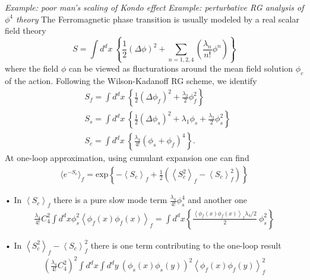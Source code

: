 \documentclass[submission, PhysLectNotes]{SciPost}
\newcommand{\ExOp}[1]{\left\langle#1\right\rangle}
\begin{document}
{\it Example: poor man's scaling of Kondo effect}
{\it Example: perturbative RG analysis of $\phi^4$ theory}
The Ferromagnetic phase transition is usually modeled by a real scalar field theory
\begin{equation}
S = \int d^dx \ \left\{\frac{1}{2}\left(\Delta\phi\right)^2 + \sum_{n=1,2,4}\left(\frac{\lambda_n}{n!}\phi^n\right) \right\}
\end{equation}
where the field $\phi$ can be viewed as flucturations around the mean field solution $\phi_c$ of the action. Following the Wilson-Kadanoff RG scheme, we identify
\begin{equation}
\begin{aligned}
&S_f = \int d^dx \ \left\{\frac{1}{2}\left(\Delta\phi_f\right)^2 + \frac{\lambda_2}{2}\phi_f^2 \right\} \\
&S_s = \int d^dx \ \left\{\frac{1}{2}\left(\Delta\phi_s\right)^2 + \lambda_1 \phi_s + \frac{\lambda_2}{2}\phi_s^2 \right\} \\
&S_c = \int d^dx \ \left\{ \frac{\lambda_4}{4!}\left(\phi_s + \phi_f\right)^4 \right\}.
\end{aligned}
\end{equation}
At one-loop approximation, using cumulant expansion one can find
\begin{equation}
\begin{aligned}
\langle e^{-S_c} \rangle_f = \mathrm{exp}\left\{{-\ExOp{S_c}_f + \frac{1}{2}\left( \ExOp{S_c^2}_f - \ExOp{S_c}_f^2\right)}\right\}
\end{aligned}
\end{equation}%

• In $\ExOp{S_c}_f$ there is a pure slow mode term $\frac{\lambda_4}{4!}\phi_s^4$ and another one
\begin{equation}
\begin{aligned}
\frac{\lambda_4}{4!} C^2_4 \int d^dx  \phi_s^2 \ExOp{\phi_f(x)\phi_f(x)}_f = \int d^dx \left\{ \frac{\ExOp{\phi_f(x)\phi_f(x)}_f\lambda_4/2}{2}\ \phi_s^2\right\}
\end{aligned}
\end{equation}

• In $\ExOp{S_c^2}_f - \ExOp{S_c}_f^2$ there is one term contributing to the one-loop result
\begin{equation}
\begin{aligned}
\left( \frac{\lambda_4}{4!} C^2_4 \right)^2 \int d^dx \int d^dy \ \left(\phi_s(x)\phi_s(y)\right)^2 \ExOp{\phi_f(x) \phi_f(y)}_f^2
\end{aligned}
\end{equation}
\end{document}
